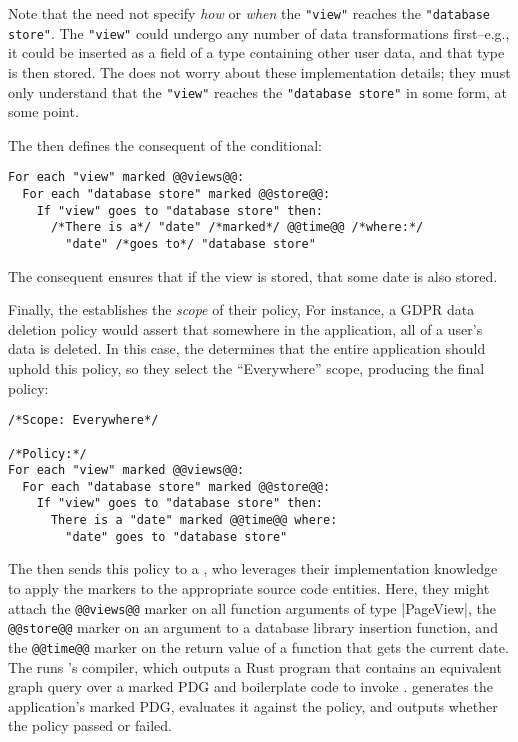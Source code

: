 Note that the \ce{} need not specify \emph{how} or \emph{when} the \lstinline[language=CNL]|"view"| reaches the \lstinline[language=CNL]|"database store"|.
%
The \lstinline[language=CNL]|"view"| could undergo any number of data transformations first--e.g., it could be inserted as a field of a type containing other user data,
and that type is then stored.
%
The \ce{} does not worry about these implementation details; they must only understand that the \lstinline[language=CNL]|"view"| reaches the \lstinline[language=CNL]|"database store"|
in some form, at some point.
%

The \ce{} then defines the consequent of the conditional:
\begin{lstlisting}[language=CNL]
For each "view" marked @@views@@:
  For each "database store" marked @@store@@:
    If "view" goes to "database store" then:
      /*There is a*/ "date" /*marked*/ @@time@@ /*where:*/
        "date" /*goes to*/ "database store"
\end{lstlisting}
%
The consequent ensures that if the view is stored, that some date is also stored.
%
%

Finally, the \ce{} establishes the \emph{scope} of their policy,
%
For instance, a GDPR data deletion policy would assert that somewhere in the application, 
all of a user's data is deleted.
%
In this case, the \ce{} determines that the entire application should uphold this policy, so they select the ``Everywhere'' scope,
producing the final policy:

\begin{lstlisting}[language=CNL]
/*Scope: Everywhere*/

/*Policy:*/
For each "view" marked @@views@@:
  For each "database store" marked @@store@@:
    If "view" goes to "database store" then:
      There is a "date" marked @@time@@ where:
        "date" goes to "database store"
\end{lstlisting}

The \ce{} then sends this policy to a \dev{}, 
who leverages their implementation knowledge to apply the markers to the appropriate source code entities.
%
Here, they might attach the \lstinline[language=CNL]|@@views@@| marker on all function arguments of type |PageView|,
the \lstinline[language=CNL]|@@store@@| marker on an argument to a database library insertion function,
and the \lstinline[language=CNL]|@@time@@| marker on the return value of a function that gets the current date.
%
The \dev{} runs \syslang{}'s compiler, 
which outputs a Rust program that contains an equivalent graph query over a marked PDG 
and boilerplate code to invoke \sys{}.
%
\sys{} generates the application's marked PDG, 
evaluates it against the policy,
and outputs whether the policy passed or failed.
%
